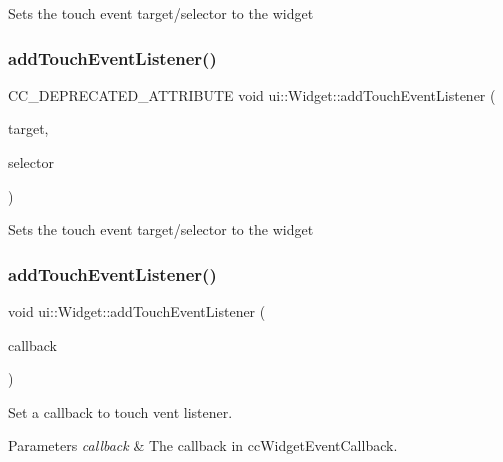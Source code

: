 Sets the touch event target/selector to the widget \mbox{\label{classui_1_1Widget_a5265726a03f69c3bc8dc65420070c41a}} 
\subsubsection{\texorpdfstring{add\+Touch\+Event\+Listener()}{addTouchEventListener()}\hspace{0.1cm}{\footnotesize\ttfamily [2/4]}}
{\footnotesize\ttfamily C\+C\+\_\+\+D\+E\+P\+R\+E\+C\+A\+T\+E\+D\+\_\+\+A\+T\+T\+R\+I\+B\+U\+TE void ui\+::\+Widget\+::add\+Touch\+Event\+Listener (\begin{DoxyParamCaption}\item[{\hyperlink{classRef}{Ref} $\ast$}]{target,  }\item[{S\+E\+L\+\_\+\+Touch\+Event}]{selector }\end{DoxyParamCaption})}

Sets the touch event target/selector to the widget \mbox{\label{classui_1_1Widget_a13169efe07b00813c563f56a5753acfe}} 
\subsubsection{\texorpdfstring{add\+Touch\+Event\+Listener()}{addTouchEventListener()}\hspace{0.1cm}{\footnotesize\ttfamily [3/4]}}
{\footnotesize\ttfamily void ui\+::\+Widget\+::add\+Touch\+Event\+Listener (\begin{DoxyParamCaption}\item[{const \hyperlink{classui_1_1Widget_a4f2987649ba5a33d1edb8b13279b03c9}{cc\+Widget\+Touch\+Callback} \&}]{callback }\end{DoxyParamCaption})}

Set a callback to touch vent listener. 
\begin{DoxyParams}{Parameters}
{\em callback} & The callback in {\ttfamily cc\+Widget\+Event\+Callback.} \\
\hline
\end{DoxyParams}
\mbox{\label{classui_1_1Widget_a13169efe07b00813c563f56a5753acfe}} 
